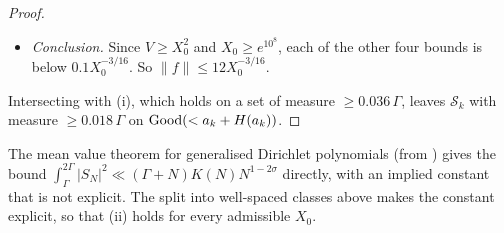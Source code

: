 \begin{proof}
\begin{itemize}
$\lfloor K(N)\rfloor$ classes by the index modulo $\lfloor K(N)\rfloor$. Consecutive elements $n<n'$ of a class are $\lfloor K(N)\rfloor$ places
apart, so $n'>n+2$ and $\log n'-\log n\ge\log(1+1/N)\ge1/(N+1)$. By \eqref{eq:MV} for each class, and Cauchy--Schwarz over the classes,
\[
  \int_{\Gamma-1/4}^{2\Gamma+1/4}|S_N(\sigma+it)|^2\,dt\le K(N)\bigl(\Gamma+\tfrac12+3\pi(N+1)\bigr)\cdot1.02N^{1-2\sigma}.
\]
For $\sigma\ge\frac34$, $N\ge\Xm/2$ and $\eta\le\frac18$ this gives $\|S_N\|^2\le1.2N^{\eta-1/2}(1+10N/\Gamma)$. Summing $\|S_N\|$ over the
blocks gives two geometric series, with ratios $\le2^{-3/16}$ and $\ge2^{1/4}$; so, by \eqref{eq:Gammalow},
\[
  \|S\|\le11X_0^{-3/16}+22\,a_k^{\eta/2+1/4}\,\Gamma^{-1/2}\le11X_0^{-3/16}+32(X_0V^3)^{1/2}a_k^{(\theta+\eta)/2-1/4}.
\]
Here $(\theta+\eta)/2-\frac14\le-2.5\cdot10^{-5}$, since $\eta=3\cdot10^{-5}$ and $\theta\le\frac12-10^{-4}$. This is where
$\theta\le\theta_1$ is used.
\item \emph{Conclusion.} Since $V\ge X_0^2$ and $X_0\ge e^{10^8}$, each of the other four bounds is below $0.1X_0^{-3/16}$. So
$\|f\|\le12X_0^{-3/16}$.
\end{itemize}
Intersecting with (i), which holds on a set of measure $\ge0.036\,\Gamma$, leaves $\mathcal S_k$ with measure $\ge0.018\,\Gamma$ on
$\mathrm{Good}(<a_k+H(a_k))$.
\end{proof}

\begin{remark}
The mean value theorem for generalised Dirichlet polynomials \cite[Thm.~2.1]{Broucke2024} (from \cite{BrouckeDebruyne2023}) gives the
bound $\int_\Gamma^{2\Gamma}|S_N|^2\ll(\Gamma+N)K(N)N^{1-2\sigma}$ directly, with an implied constant that is not explicit. The split into
well-spaced classes above makes the constant explicit, so that (ii) holds for every admissible $X_0$.
\end{remark}


